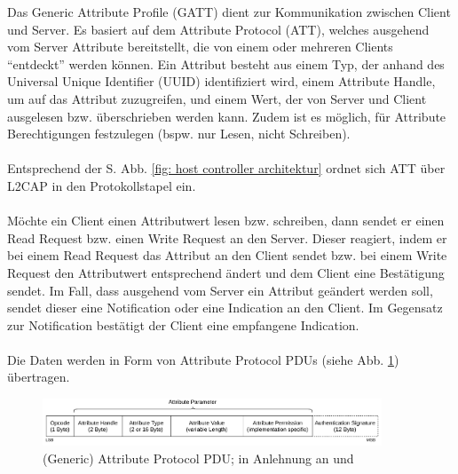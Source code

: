 Das Generic Attribute Profile (GATT) dient zur Kommunikation zwischen Client und Server. Es basiert auf dem Attribute Protocol (ATT), welches ausgehend vom Server Attribute bereitstellt, die von einem oder mehreren Clients "`entdeckt"' werden können. Ein Attribut besteht aus einem Typ, der anhand des Universal Unique Identifier (UUID) identifiziert wird, einem Attribute Handle, um auf das Attribut zuzugreifen, und einem Wert, der von Server und Client ausgelesen bzw. überschrieben werden kann. Zudem ist es möglich, für Attribute Berechtigungen festzulegen (bspw. nur Lesen, nicht Schreiben). \cite{BtSpec4.0_1835}
\\\\
Entsprechend der S. \pageref{fig: host controller architektur} Abb. \ref{fig: host controller architektur} ordnet sich ATT über L2CAP in den Protokollstapel ein.
\\\\
Möchte ein Client einen Attributwert lesen bzw. schreiben, dann sendet er einen Read Request bzw. einen Write Request an den Server. Dieser reagiert, indem er bei einem Read Request das Attribut an den Client sendet bzw. bei einem Write Request den Attributwert entsprechend ändert und dem Client eine Bestätigung sendet. Im Fall, dass ausgehend vom Server ein Attribut geändert werden soll, sendet dieser eine Notification oder eine Indication an den Client. Im Gegensatz zur Notification bestätigt der Client eine empfangene Indication. \cite{BtSpec4.0_1854-1855} \cite{BtSpec4.0_1861-1863}
\\\\
Die Daten werden in Form von Attribute Protocol PDUs (siehe Abb. \ref{fig: att pdu}) übertragen.

\begin{figure}[H]
    \centering
    \includegraphics[width=0.9\textwidth]{graphics/att_pdu.pdf}
    \caption[(Generic) Attribute Protocol PDU]{(Generic) Attribute Protocol PDU; in Anlehnung an \cite{BtSpec4.0_fig_1888} und \cite{BtSpec4.0_fig_1889}}
    \label{fig: att pdu}
\end{figure}


